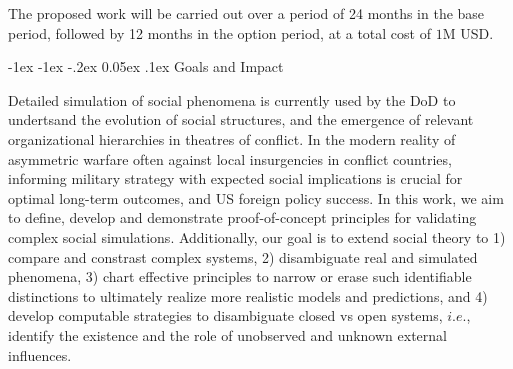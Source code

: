 \documentclass[onecolumn, compsoc,11pt]{IEEEtran}
\makeatletter
\renewcommand\section{\@startsection {section}{1}{\z@}%
  {-1ex \@plus -1ex \@minus -.2ex}%
  {0.05ex \@plus.1ex}%
  {\large\bfseries\scshape}}
\makeatother
\begin{document}
The proposed work will be carried out over a period of 24 months in the base period, followed by 12 months in the option period, at a total cost of $1$M USD. 


\section{Goals and Impact}
\setcounter{page}{1}



Detailed simulation of social phenomena is currently used by the DoD to undertsand the evolution  of social structures, and the emergence of relevant  organizational hierarchies  in theatres of conflict. In the modern reality of asymmetric warfare often against local insurgencies in conflict countries, informing military strategy with expected social implications is crucial for optimal long-term outcomes, and US  foreign policy success.
In this work, we aim to define, develop and demonstrate proof-of-concept principles for validating  complex social simulations. Additionally, our goal is to  extend social theory to 1)  compare and constrast complex systems, 2)  disambiguate real and simulated phenomena,   3) chart effective principles to narrow or erase such identifiable distinctions to ultimately realize more realistic models and predictions, and 4) develop computable strategies  to disambiguate closed vs open systems, $i.e.$, identify the existence and the role of  unobserved and unknown  external influences.
\end{document}
